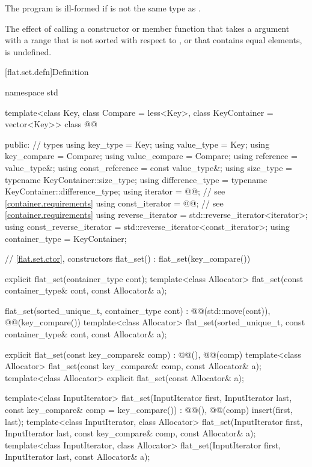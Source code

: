 \pnum
The program is ill-formed if  is not the same type
as .

\pnum
The effect of calling a constructor or member function
that takes a  argument
with a range that is not sorted with respect to , or
that contains equal elements, is undefined.

[flat.set.defn]{Definition}

\begin{codeblock}
namespace std {
  template<class Key, class Compare = less<Key>, class KeyContainer = vector<Key>>
  class @@ {
  public:
    // types
    using key_type                  = Key;
    using value_type                = Key;
    using key_compare               = Compare;
    using value_compare             = Compare;
    using reference                 = value_type&;
    using const_reference           = const value_type&;
    using size_type                 = typename KeyContainer::size_type;
    using difference_type           = typename KeyContainer::difference_type;
    using iterator                  = @@;  // see \ref{container.requirements}
    using const_iterator            = @@;  // see \ref{container.requirements}
    using reverse_iterator          = std::reverse_iterator<iterator>;
    using const_reverse_iterator    = std::reverse_iterator<const_iterator>;
    using container_type            = KeyContainer;

    // \ref{flat.set.ctor}, constructors
    flat_set() : flat_set(key_compare()) { }

    explicit flat_set(container_type cont);
    template<class Allocator>
      flat_set(const container_type& cont, const Allocator& a);

    flat_set(sorted_unique_t, container_type cont)
      : @@(std::move(cont)), @@(key_compare()) { }
    template<class Allocator>
      flat_set(sorted_unique_t, const container_type& cont, const Allocator& a);

    explicit flat_set(const key_compare& comp)
      : @@(), @@(comp) { }
    template<class Allocator>
      flat_set(const key_compare& comp, const Allocator& a);
    template<class Allocator>
      explicit flat_set(const Allocator& a);

    template<class InputIterator>
      flat_set(InputIterator first, InputIterator last, const key_compare& comp = key_compare())
        : @@(), @@(comp)
        { insert(first, last); }
    template<class InputIterator, class Allocator>
      flat_set(InputIterator first, InputIterator last,
               const key_compare& comp, const Allocator& a);
    template<class InputIterator, class Allocator>
      flat_set(InputIterator first, InputIterator last, const Allocator& a);

}}
\end{codeblock}
